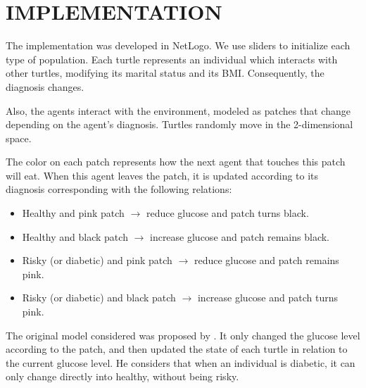 \section{IMPLEMENTATION}
The implementation was developed in NetLogo. We use sliders to initialize each type of population. Each turtle represents an individual which interacts with other turtles, modifying its marital status and its BMI. Consequently, the diagnosis changes.

Also, the agents interact with the environment, modeled as patches that change depending on the agent's diagnosis. Turtles randomly move in the 2-dimensional space.

The color on each patch represents how the next agent that touches this patch will eat. When this agent leaves the patch, it is updated according to its diagnosis corresponding with the following relations:
\begin{itemize}
\item Healthy and pink patch $\rightarrow$ reduce glucose and patch turns black.
\item Healthy and black patch $\rightarrow$ increase glucose and patch remains black.
\item Risky (or diabetic) and pink patch $\rightarrow$ reduce glucose and patch remains pink.
\item Risky (or diabetic) and black patch $\rightarrow$ increase glucose and patch turns pink.
\end{itemize}

The original model considered was proposed by \cite{netlogomodel}. It only changed the glucose level according to the patch, and then updated the state of each turtle in relation to the current glucose level. He considers that when an individual is diabetic, it can only change directly into healthy, without being risky.

